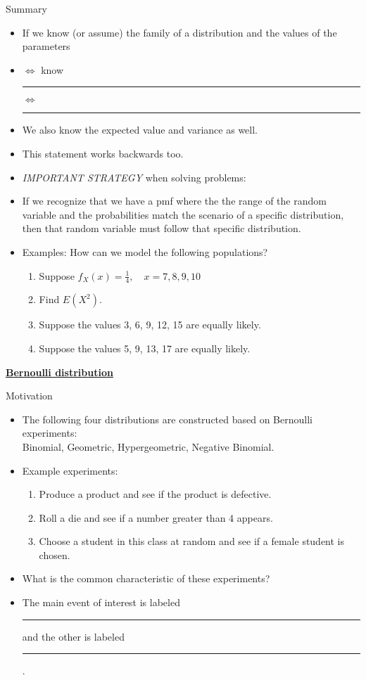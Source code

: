 \documentclass{article}
\newcommand{\bu}[1]{\textbf{\ul{#1}}}				%
\newcommand{\blankul}[1]{\rule[-1.5mm]{#1}{0.15mm}}	%
\begin{document}
Summary\bigskip
\begin{itemize}
    \item If we know (or assume) the family of a distribution and the values of the parameters
    \item[] $\Longleftrightarrow$ know \blankul{2cm} $\Longleftrightarrow$ \blankul{2cm}
    \item[] We also know the expected value and variance as well.
    \item This statement works backwards too.
    \item \textit{IMPORTANT STRATEGY} when solving problems:
    \item[] If we recognize that we have a pmf where the the range of the random variable and the probabilities match the scenario of a specific distribution, then that random variable must follow that specific distribution.\bigskip
    \item Examples: How can we model the following populations?
    \begin{enumerate}
        \item Suppose $f_X(x) = \frac{1}{4}, \quad x = 7, 8, 9, 10$\vspace{60pt}
        \item[] Find $E(X^2)$.\vspace{60pt}
        \item Suppose the values 3, 6, 9, 12, 15 are equally likely.\vspace{30pt}
        \item Suppose the values 5, 9, 13, 17 are equally likely.\vspace{30pt} 
    \end{enumerate}
\end{itemize}\bigskip

\bu{Bernoulli distribution}\bigskip

Motivation\bigskip
\begin{itemize}
    \item The following four distributions are constructed based on Bernoulli experiments: \\Binomial, Geometric, Hypergeometric, Negative Binomial.
    \item Example experiments:
    \begin{enumerate}
        \item Produce a product and see if the product is defective.
        \item Roll a die and see if a number greater than 4 appears.
        \item Choose a student in this class at random and see if a female student is chosen.
    \end{enumerate}
    \item What is the common characteristic of these experiments?\bigskip
    \item The main event of interest is labeled \blankul{2.5cm} and the other is labeled \blankul{2.5cm}.
\end{itemize}\bigskip
\end{document}
